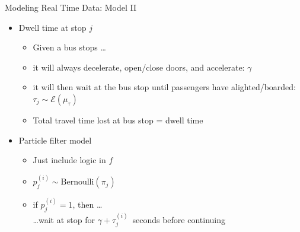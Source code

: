 \documentclass[10pt,t]{beamer}
\begin{document}
\begin{frame}{Modeling Real Time Data: Model II}
  \onslide<+->
  \begin{itemize}[<+- | alert@+>]
    \item Dwell time at stop $j$
      \begin{itemize}
        \item Given a bus stops \ldots
        \item it will always decelerate,
          open/close doors, and accelerate: $\gamma$
        \item it will then wait at the bus stop until passengers
          have alighted/boarded: $\tau_j \sim \mathcal{E}(\mu_\tau)$
        \item Total travel time lost at bus stop = dwell time
      \end{itemize}

    \item Particle filter model
      \begin{itemize}
        \item Just include logic in $f$
        \item $p_j^{(i)} \sim \text{Bernoulli}(\pi_j)$
        \item if $p_j^{(i)} = 1$, then \ldots\\
          \ldots wait at stop for $\gamma + \tau_j^{(i)}$~seconds before continuing
      \end{itemize}
  \end{itemize}
  \onslide<+->
\end{frame}
\end{document}
